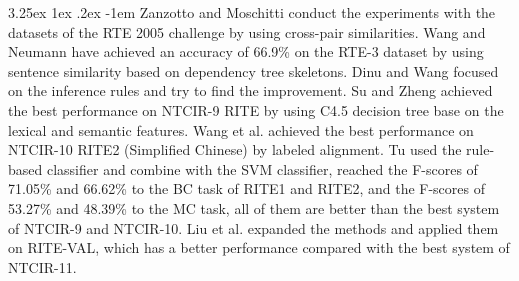\documentclass[12pt]{article}
\makeatletter
\renewcommand\paragraph{\@startsection{paragraph}{5}{\z@}%
  {3.25ex \@plus1ex \@minus.2ex}%
  {-1em}%
  {\normalfont\normalsize\bfseries}}
\makeatother
\begin{document}
\begin{CJK*}{UTF8}{bkai}
\begin{spacing}{1.77}
\paragraph{}
Zanzotto and Moschitti\cite{zanzotto_moschitti_2006} conduct the experiments with the datasets of the RTE 2005 challenge by using cross-pair similarities. Wang and Neumann\cite{wang_neumann_2007} have achieved an accuracy of 66.9\% on the RTE-3 dataset by using sentence similarity based on dependency tree skeletons. Dinu and Wang\cite{dinu_wang_2009} focused on the inference rules and try to find the improvement. Su and Zheng\cite{su_zheng_2011} achieved the best performance on NTCIR-9 RITE by using C4.5 decision tree base on the lexical and semantic features. Wang et al.\cite{wang-etal-2013-labeled} achieved the best performance on NTCIR-10 RITE2 (Simplified Chinese) by labeled alignment. Tu\cite{tu_2015} used the rule-based classifier and combine with the SVM classifier, reached the F-scores of 71.05\% and 66.62\% to the BC task of RITE1 and RITE2, and the F-scores of 53.27\% and 48.39\% to the MC task, all of them are better than the best system of NTCIR-9 and NTCIR-10. Liu et al.\cite{liu_2016_paper} expanded the methods and applied them on RITE-VAL, which has a better performance compared with the best system of NTCIR-11.


\end{spacing}
\end{CJK*}
\end{document}
